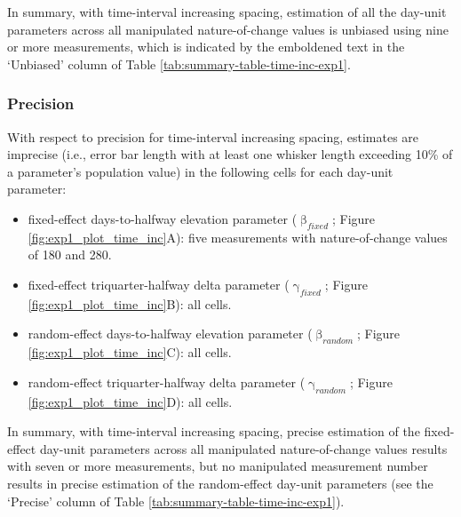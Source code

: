 \documentclass[
12pt, %
twoside,
english]{guelphthesis}
\theoremstyle{definition}
\theoremstyle{definition}
\theoremstyle{definition}
\theoremstyle{definition}
\theoremstyle{remark}
\begin{document}
In summary, with time-interval increasing spacing, estimation of all the day-unit parameters across all manipulated nature-of-change values is unbiased using nine or more measurements, which is indicated by the emboldened text in the `Unbiased' column of Table \ref{tab:summary-table-time-inc-exp1}.

\hypertarget{precision-time-inc-exp1}{%
\subsubsection{Precision}\label{precision-time-inc-exp1}}

With respect to precision for time-interval increasing spacing, estimates are imprecise (i.e., error bar length with at least one whisker length exceeding 10\% of a parameter's population value) in the following cells for each day-unit parameter:
\begin{itemize}
\tightlist
\item
  fixed-effect days-to-halfway elevation parameter (\(\upbeta_{fixed}\); Figure \ref{fig:exp1_plot_time_inc}A): five measurements with nature-of-change values of 180 and 280.
\item
  fixed-effect triquarter-halfway delta parameter (\(\upgamma_{fixed}\); Figure \ref{fig:exp1_plot_time_inc}B): all cells.
\item
  random-effect days-to-halfway elevation parameter (\(\upbeta_{random}\); Figure \ref{fig:exp1_plot_time_inc}C): all cells.
\item
  random-effect triquarter-halfway delta parameter (\(\upgamma_{random}\); Figure \ref{fig:exp1_plot_time_inc}D): all cells.
\end{itemize}
In summary, with time-interval increasing spacing, precise estimation of the fixed-effect day-unit parameters across all manipulated nature-of-change values results with seven or more measurements, but no manipulated measurement number results in precise estimation of the random-effect day-unit parameters (see the `Precise' column of Table \ref{tab:summary-table-time-inc-exp1}).
\end{document}
